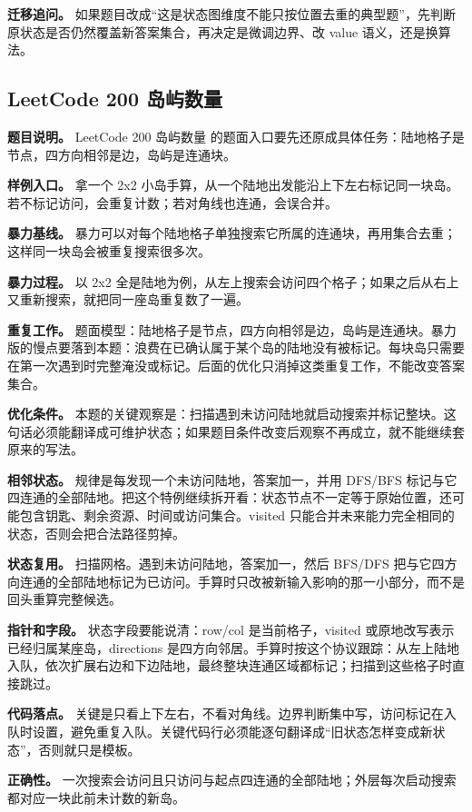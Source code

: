 \textbf{迁移追问。} 如果题目改成“这是状态图维度不能只按位置去重的典型题”，先判断原状态是否仍然覆盖新答案集合，再决定是微调边界、改 value 语义，还是换算法。

\subsection{LeetCode 200 岛屿数量}

\textbf{题目说明。} LeetCode 200 岛屿数量 的题面入口要先还原成具体任务：陆地格子是节点，四方向相邻是边，岛屿是连通块。

\textbf{样例入口。} 拿一个 2x2 小岛手算，从一个陆地出发能沿上下左右标记同一块岛。若不标记访问，会重复计数；若对角线也连通，会误合并。

\textbf{暴力基线。} 暴力可以对每个陆地格子单独搜索它所属的连通块，再用集合去重；这样同一块岛会被重复搜索很多次。

\textbf{暴力过程。} 以 2x2 全是陆地为例，从左上搜索会访问四个格子；如果之后从右上又重新搜索，就把同一座岛重复数了一遍。

\textbf{重复工作。} 题面模型：陆地格子是节点，四方向相邻是边，岛屿是连通块。暴力版的慢点要落到本题：浪费在已确认属于某个岛的陆地没有被标记。每块岛只需要在第一次遇到时完整淹没或标记。后面的优化只消掉这类重复工作，不能改变答案集合。

\textbf{优化条件。} 本题的关键观察是：扫描遇到未访问陆地就启动搜索并标记整块。这句话必须能翻译成可维护状态；如果题目条件改变后观察不再成立，就不能继续套原来的写法。

\textbf{相邻状态。} 规律是每发现一个未访问陆地，答案加一，并用 DFS/BFS 标记与它四连通的全部陆地。把这个特例继续拆开看：状态节点不一定等于原始位置，还可能包含钥匙、剩余资源、时间或访问集合。visited 只能合并未来能力完全相同的状态，否则会把合法路径剪掉。

\textbf{状态复用。} 扫描网格。遇到未访问陆地，答案加一，然后 BFS/DFS 把与它四方向连通的全部陆地标记为已访问。手算时只改被新输入影响的那一小部分，而不是回头重算完整候选。

\textbf{指针和字段。} 状态字段要能说清：row/col 是当前格子，visited 或原地改写表示已经归属某座岛，directions 是四方向邻居。手算时按这个协议跟踪：从左上陆地入队，依次扩展右边和下边陆地，最终整块连通区域都标记；扫描到这些格子时直接跳过。

\textbf{代码落点。} 关键是只看上下左右，不看对角线。边界判断集中写，访问标记在入队时设置，避免重复入队。关键代码行必须能逐句翻译成“旧状态怎样变成新状态”，否则就只是模板。

\textbf{正确性。} 一次搜索会访问且只访问与起点四连通的全部陆地；外层每次启动搜索都对应一块此前未计数的新岛。

